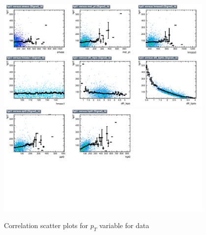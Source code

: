 \begin{figure}[!htb]%
\centering
\includegraphics[width=0.95\textwidth]{figures/CRTT/dataset/plots/correlationscatter_hpt1__Id_c1.pdf}
\includegraphics[width=0.95\textwidth]{figures/CRTT/dataset/plots/correlationscatter_hpt1__Id_c2.pdf}
\caption{ Correlation scatter plots for \HBB $p_{T}$  variable for data}%
\label{fig:correlations_CRTT_hpt1_S}                                                       
\end{figure}



